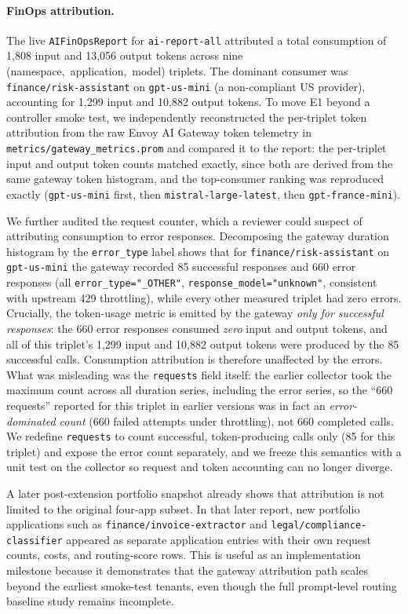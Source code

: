 \paragraph{FinOps attribution.}
The live \texttt{AIFinOpsReport} for \texttt{ai-report-all} attributed a total consumption of 1{,}808 input and 13{,}056 output tokens across nine \mbox{(namespace, application, model)} triplets. The dominant consumer was \texttt{finance/risk-assistant} on \texttt{gpt-us-mini} (a non-compliant US provider), accounting for 1{,}299 input and 10{,}882 output tokens. To move E1 beyond a controller smoke test, we independently reconstructed the per-triplet token attribution from the raw Envoy AI Gateway token telemetry in \texttt{metrics/gateway\_metrics.prom} and compared it to the report: the per-triplet input and output token counts matched exactly, since both are derived from the same gateway token histogram, and the top-consumer ranking was reproduced exactly (\texttt{gpt-us-mini} first, then \texttt{mistral-large-latest}, then \texttt{gpt-france-mini}).

We further audited the request counter, which a reviewer could suspect of attributing consumption to error responses. Decomposing the gateway duration histogram by the \texttt{error\_type} label shows that for \texttt{finance/risk-assistant} on \texttt{gpt-us-mini} the gateway recorded 85 successful responses and 660 error responses (all \texttt{error\_type="\_OTHER"}, \texttt{response\_model="unknown"}, consistent with upstream 429 throttling), while every other measured triplet had zero errors. Crucially, the token-usage metric is emitted by the gateway \emph{only for successful responses}: the 660 error responses consumed \emph{zero} input and output tokens, and all of this triplet's 1{,}299 input and 10{,}882 output tokens were produced by the 85 successful calls. Consumption attribution is therefore unaffected by the errors. What was misleading was the \texttt{requests} field itself: the earlier collector took the maximum count across all duration series, including the error series, so the ``660 requests'' reported for this triplet in earlier versions was in fact an \emph{error-dominated count} (660 failed attempts under throttling), not 660 completed calls. We redefine \texttt{requests} to count successful, token-producing calls only (85 for this triplet) and expose the error count separately, and we freeze this semantics with a unit test on the collector so request and token accounting can no longer diverge.

A later post-extension portfolio snapshot already shows that attribution is not
limited to the original four-app subset. In that later report, new portfolio
applications such as \texttt{finance/invoice-extractor} and
\texttt{legal/compliance-classifier} appeared as separate application entries
with their own request counts, costs, and routing-score rows. This is useful as
an implementation milestone because it demonstrates that the gateway attribution
path scales beyond the earliest smoke-test tenants, even though the full
prompt-level routing baseline study remains incomplete.

